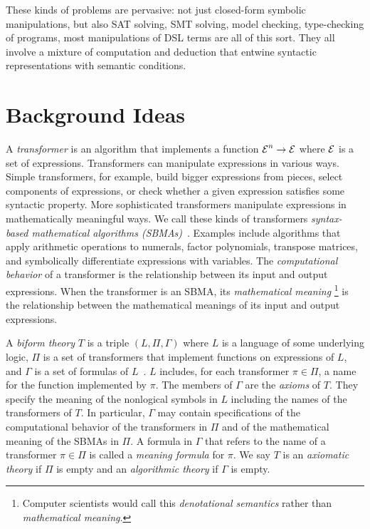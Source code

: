 \documentclass[fleqn]{llncs}
\begin{document}
These kinds of problems are pervasive: not just closed-form symbolic
manipulations, but also SAT solving, SMT solving, model checking,
type-checking of programs, most manipulations of DSL terms are all
of this sort.  They all involve a mixture of computation and deduction
that entwine syntactic representations with semantic conditions.

\section{Background Ideas}

A \emph{transformer} is an algorithm that implements a function $\mbox{$\cal E$}^n
\rightarrow \mbox{$\cal E$}$ where $\mbox{$\cal E$}$ is a set of expressions.  Transformers can
manipulate expressions in various ways.  Simple transformers, for
example, build bigger expressions from pieces, select components of
expressions, or check whether a given expression satisfies some
syntactic property.  More sophisticated transformers manipulate
expressions in mathematically meaningful ways.  We call these kinds of
transformers \emph{syntax-based mathematical algorithms
  (SBMAs)}~\cite{Farmer13}.  Examples include algorithms that apply
arithmetic operations to numerals, factor polynomials, transpose
matrices, and symbolically differentiate expressions with variables.
The \emph{computational behavior} of a transformer is the relationship
between its input and output expressions.  When the transformer is an
SBMA, its \emph{mathematical meaning}%
\footnote{Computer scientists would call this \emph{denotational semantics}
rather than \emph{mathematical meaning}.} is the relationship between the
mathematical meanings of its input and output expressions.

A \emph{biform theory} $T$ is a triple $(L,\Pi,\Gamma)$ where $L$ is a
language of some underlying logic, $\Pi$ is a set of transformers that
implement functions on expressions of $L$, and $\Gamma$ is a set of
formulas of
$L$~\cite{CaretteFarmer08,Farmer07b,FarmerMohrenschildt03}.  $L$
includes, for each transformer $\pi \in \Pi$, a name for the function
implemented by $\pi$.  The members of $\Gamma$ are the \emph{axioms}
of $T$.  They specify the meaning of the nonlogical symbols in $L$
including the names of the transformers of $T$.  In particular,
$\Gamma$ may contain specifications of the computational behavior of
the transformers in $\Pi$ and of the mathematical meaning of the SBMAs
in $\Pi$.  A formula in $\Gamma$ that refers to the name of a
transformer $\pi \in \Pi$ is called a \emph{meaning formula} for
$\pi$.  We say $T$ is an \emph{axiomatic theory} if $\Pi$ is empty and
an \emph{algorithmic theory} if $\Gamma$ is empty.
\end{document}
